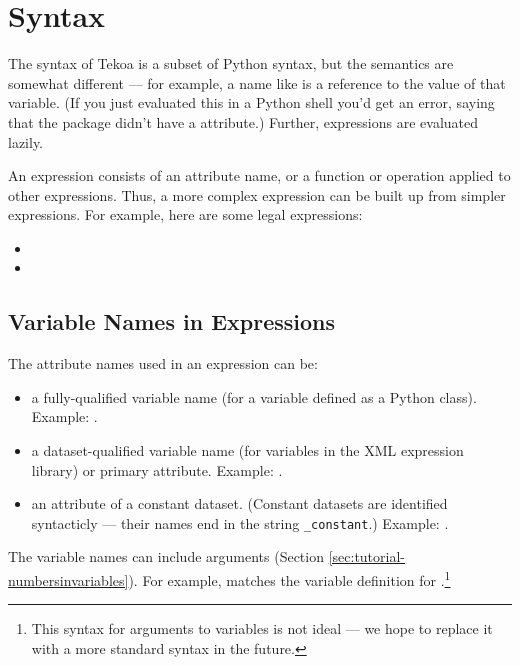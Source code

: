 \section{Syntax}

The syntax of Tekoa is a subset of Python syntax, but the semantics are
somewhat different --- for example, a name like
 is a reference to the value of that
variable.  (If you just evaluated this in a Python shell you'd get an
error, saying that the  package didn't have a
 attribute.)  Further, expressions are evaluated
lazily.

An expression consists of an attribute name, or a function or operation
applied to other expressions.  Thus, a more complex expression can be built
up from simpler expressions.  For example, here are some legal expressions:

\begin{itemize}

\item {}
\item {}

\end{itemize}

\subsection{Variable Names in Expressions}

The attribute names used in an expression can be:

\begin{itemize}
\item a fully-qualified variable name (for a variable defined as a Python
  class).  Example: .

\item a dataset-qualified variable name (for variables in the XML
  expression library) or primary attribute.  Example:
  .

\item an attribute of a constant dataset.  (Constant datasets are
  identified syntacticly --- their names end in the string \verb|_constant|.)
  Example: .

\end{itemize}

The variable names can include arguments (Section
\ref{sec:tutorial-numbersinvariables}). For example, 
matches the variable definition for
.\footnote{This syntax for arguments
  to variables is not ideal --- we hope to replace it with a more standard
  syntax in the future.}

